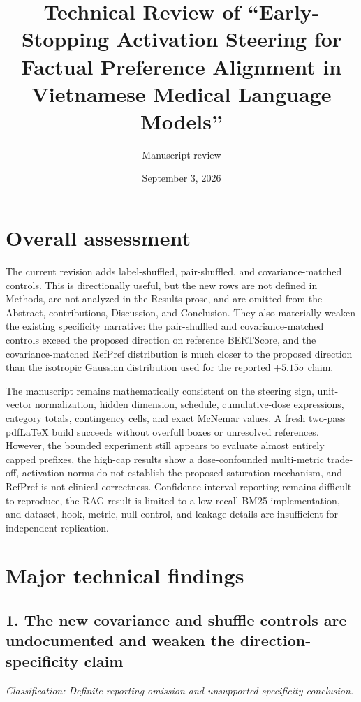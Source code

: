 \documentclass[11pt]{article}
\title{Technical Review of ``Early-Stopping Activation Steering for Factual Preference Alignment in Vietnamese Medical Language Models''}
\author{Manuscript review}
\date{September 3, 2026}
\newcommand{\classification}[1]{\textit{Classification: #1.}}
\begin{document}
\maketitle

\section*{Overall assessment}

The current revision adds label-shuffled, pair-shuffled, and covariance-matched controls.  This is directionally useful, but the new rows are not defined in Methods, are not analyzed in the Results prose, and are omitted from the Abstract, contributions, Discussion, and Conclusion.  They also materially weaken the existing specificity narrative: the pair-shuffled and covariance-matched controls exceed the proposed direction on reference BERTScore, and the covariance-matched RefPref distribution is much closer to the proposed direction than the isotropic Gaussian distribution used for the reported $+5.15\sigma$ claim.

The manuscript remains mathematically consistent on the steering sign, unit-vector normalization, hidden dimension, schedule, cumulative-dose expressions, category totals, contingency cells, and exact McNemar values.  A fresh two-pass pdfLaTeX build succeeds without overfull boxes or unresolved references.  However, the bounded experiment still appears to evaluate almost entirely capped prefixes, the high-cap results show a dose-confounded multi-metric trade-off, activation norms do not establish the proposed saturation mechanism, and RefPref is not clinical correctness.  Confidence-interval reporting remains difficult to reproduce, the RAG result is limited to a low-recall BM25 implementation, and dataset, hook, metric, null-control, and leakage details are insufficient for independent replication.

\section*{Major technical findings}

\subsection*{1. The new covariance and shuffle controls are undocumented and weaken the direction-specificity claim}

\classification{Definite reporting omission and unsupported specificity conclusion}
\end{document}
